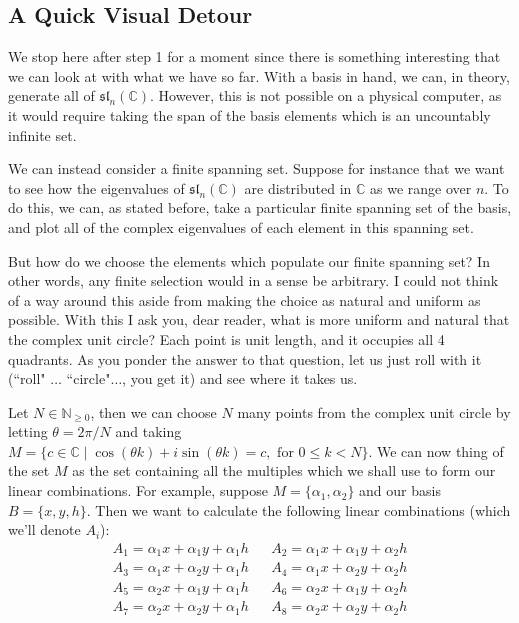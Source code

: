 \documentclass[12pt]{article}
\theoremstyle{definition}
\theoremstyle{definition}
\begin{document}
    \subsection{A Quick Visual Detour}
        We stop here after step 1 for a moment since there is something
        interesting that we can look at with what we have so far. With a basis
        in hand, we can, in theory, generate all of
        $\mathfrak{sl}_n(\mathbb{C})$. However, this is not possible on
        a physical computer, as it
        would require taking the span of the basis elements which is an
        uncountably infinite set.\par\hspace{4mm} We can instead consider a finite spanning
        set. Suppose for instance that we want to see how the eigenvalues of
        $\mathfrak{sl}_n(\mathbb{C})$ are distributed in $\mathbb{C}$ as we
        range over $n$. To do this, we can, as stated before, take a particular
        finite spanning set of the basis, and plot all of the complex
        eigenvalues of each element in this spanning set.\par\hspace{4mm} But how do we choose
        the elements which populate our finite spanning set? In other words,
        any finite selection would in a sense be arbitrary. I could not think
        of a way around this aside from making the choice as natural and
        uniform as possible. With this I ask you, dear reader, what is more
        uniform and natural that the complex unit circle? Each point is unit
        length, and it occupies all 4 quadrants. As you ponder the
        answer to that question, let us just roll with it (``roll" $\dots$
        ``circle"$\dots$, you get it) and see where it takes
        us.\par\hspace{4mm} Let $N\in\mathbb{N}_{\geq 0}$, then we can choose $N$ 
        many points from the complex unit circle by letting $\theta
        = 2\pi/N$ and taking $M=\{c\in\mathbb{C}\mid \cos(\theta
        k)+i\sin(\theta k)=c, \text{ for }0\leq k<N\}$. We can now thing of the set 
        $M$ as the set containing all the multiples which we shall use to form our 
        linear combinations. For example, suppose $M=\{\alpha_1, \alpha_2\}$ and 
        our basis $B=\{x, y, h\}$. Then we want to calculate the following linear 
        combinations (which we'll denote $A_i$):
        \begin{align*}
            &A_{1}=\alpha_1x+\alpha_1y+\alpha_1h& 
            &A_{2}=\alpha_1x+\alpha_1y+\alpha_2h& \\ 
            &A_{3}=\alpha_1x+\alpha_2y+\alpha_1h& 
            &A_{4}=\alpha_1x+\alpha_2y+\alpha_2h& \\ 
            &A_5=\alpha_2x+\alpha_1y+\alpha_1h&   
            &A_6=\alpha_2x+\alpha_1y+\alpha_2h& \\
            &A_7=\alpha_2x+\alpha_2y+\alpha_1h&   &A_8=\alpha_2x+\alpha_2y+\alpha_2h&
        \end{align*}
\end{document}
